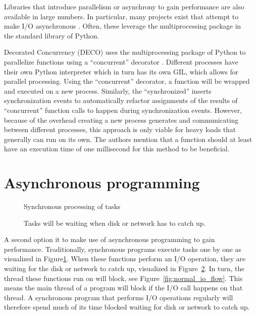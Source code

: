 Libraries that introduce parallelism or asynchrony to gain performance are also available in large numbers.
In particular, many projects exist that attempt to make I/O asynchronous \cite{asyncio2016python}.
Often, these leverage the multiprocessing package in the standard library of Python.

Decorated Concurrency (DECO) uses the multiprocessing package of Python to parallelize functions using a \enquote{concurrent} decorator \cite{sherman2016deco}.
Different processes have their own Python interpreter which in turn has its own GIL, which allows for parallel processing.
Using the \enquote{concurrent} decorator, a function will be wrapped and executed on a new process.
Similarly, the \enquote{synchronized}  inserts synchronization events to automatically refactor assignments of the results of \enquote{concurrent} function calls to happen during synchronization events.
However, because of the overhead creating a new process generates and communicating between different processes, this approach is only viable for heavy loads that generally can run on its own.
The authors mention that a function should at least have an execution time of one millisecond for this method to be beneficial.

\section{Asynchronous programming}

\begin{figure}[!h]
	\caption{Synchronous processing of tasks}
	\label{fig:normal_execution_flow}
\end{figure}

\begin{figure}[h]
	\caption{Tasks will be waiting when disk or network has to catch up.}
	\label{fig:delays_in_execution}
\end{figure}

A second option it to make use of asynchronous programming to gain performance.
Traditionally, synchronous programs execute tasks one by one as visualized in Figure\ref{fig:normal_execution_flow}.
When these functions perform an I/O operation, they are waiting for the disk or network to catch up, visualized in Figure~\ref{fig:delays_in_execution}.
In turn, the thread these functions run on will block, see Figure~\ref{fig:normal_io_flow}.
This means the main thread of a program will block if the I/O call happens on that thread.
A synchronous program that performs I/O operations regularly will therefore spend much of its time blocked waiting for disk or network to catch up.

